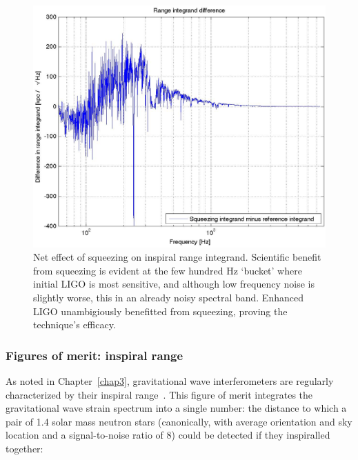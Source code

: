 \begin{figure}
\begin{center}
\includegraphics[trim=30 30 30 30, clip, height=0.5\paperheight, width=0.5\paperwidth,keepaspectratio]{range_integrand_difference.eps}
\caption{Net effect of squeezing on inspiral range integrand. Scientific benefit from squeezing is evident at the few hundred Hz `bucket' where initial LIGO is most sensitive, and although low frequency noise is slightly worse, this in an already noisy spectral band. Enhanced LIGO unambigiously benefitted from squeezing, proving the technique's efficacy.
}
\label{squeezing_range_net}
\end{center}
\end{figure}

            \subsubsection{Figures of merit: inspiral range}
            \label{range_est}

As noted in Chapter~\ref{chap3}, gravitational wave interferometers are regularly characterized by their inspiral range~\cite{FinnInspiral1993}.
This figure of merit integrates the gravitational wave strain spectrum into a single number: the distance to which a pair of 1.4 solar mass neutron stars (canonically, with average orientation and sky location and a signal-to-noise ratio of 8) could be detected if they inspiralled together:

